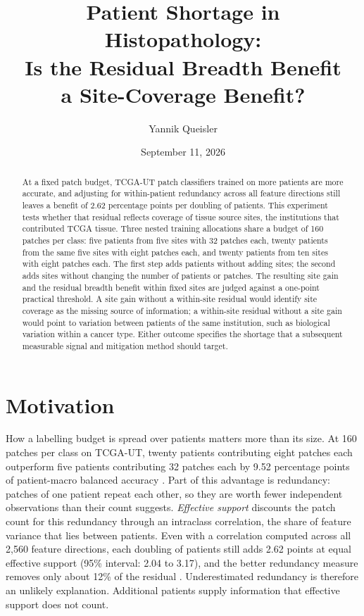 \documentclass[11pt]{article}
\title{Patient Shortage in Histopathology:\\Is the Residual Breadth Benefit\\a Site-Coverage Benefit?}
\author{Yannik Queisler}
\date{September 11, 2026}
\begin{document}
\raggedbottom
{}
\setlength{\emergencystretch}{2em}
\maketitle
\begin{abstract}
\noindent At a fixed patch budget, TCGA-UT patch classifiers trained on more patients are more accurate, and adjusting for within-patient redundancy across all feature directions still leaves a benefit of 2.62 percentage points per doubling of patients. This experiment tests whether that residual reflects coverage of tissue source sites, the institutions that contributed TCGA tissue. Three nested training allocations share a budget of 160 patches per class: five patients from five sites with 32 patches each, twenty patients from the same five sites with eight patches each, and twenty patients from ten sites with eight patches each. The first step adds patients without adding sites; the second adds sites without changing the number of patients or patches. The resulting site gain and the residual breadth benefit within fixed sites are judged against a one-point practical threshold. A site gain without a within-site residual would identify site coverage as the missing source of information; a within-site residual without a site gain would point to variation between patients of the same institution, such as biological variation within a cancer type. Either outcome specifies the shortage that a subsequent measurable signal and mitigation method should target.
\end{abstract}
\setcounter{tocdepth}{1}
\tableofcontents
\clearpage

\section{Motivation}
\label{sec:motivation}
How a labelling budget is spread over patients matters more than its size. At 160 patches per class on TCGA-UT, twenty patients contributing eight patches each outperform five patients contributing 32 patches each by 9.52 percentage points of patient-macro balanced accuracy \citep{queisler2026effectiveSupport}. Part of this advantage is redundancy: patches of one patient repeat each other, so they are worth fewer independent observations than their count suggests. \emph{Effective support} discounts the patch count for this redundancy through an intraclass correlation, the share of feature variance that lies between patients. Even with a correlation computed across all 2,560 feature directions, each doubling of patients still adds 2.62 points at equal effective support (95\% interval: 2.04 to 3.17), and the better redundancy measure removes only about 12\% of the residual \citep{queisler2026multidirectionalRedundancy}. Underestimated redundancy is therefore an unlikely explanation. Additional patients supply information that effective support does not count.
\end{document}
